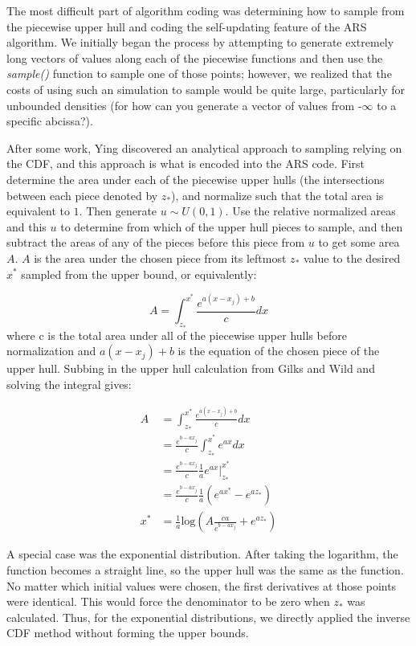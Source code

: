 \documentclass{article}
\begin{document}
The most difficult part of algorithm coding was determining how to sample from the piecewise upper hull and coding the self-updating feature of the ARS algorithm.  We initially began the process by attempting to generate extremely long vectors of values along each of the piecewise functions and then use the \textit{sample()} function to sample one of those points; however, we realized that the costs of using such an simulation to sample would be quite large, particularly for unbounded densities (for how can you generate a vector of values from -$\infty$ to a specific abcissa?).  

After some work, Ying discovered an analytical approach to sampling relying on the CDF, and this approach is what is encoded into the ARS code.  First determine the area under each of the piecewise upper hulls (the intersections between each piece denoted by $z_*$), and normalize such that the total area is equivalent to $1$.  Then generate $u\sim U\left(0, 1\right)$.  Use the relative normalized areas and this $u$ to determine from which of the upper hull pieces to sample, and then subtract the areas of any of the pieces before this piece from $u$ to get some area $A$.  $A$ is the area under the chosen piece from its leftmost $z_*$ value to the desired $x^*$ sampled from the upper bound, or equivalently:

$$A= \int_{z_*}^{x^*}\frac{e^{a\left(x-x_j\right)+b}}{c}dx$$
where c is the total area under all of the piecewise upper hulls before normalization and $a\left(x-x_j\right)+b$ is the equation of the chosen piece of the upper hull.  Subbing in the upper hull calculation from Gilks and Wild and solving the integral gives:

\begin{align*}
A &= \int_{z_*}^{x^*}\frac{e^{a\left(x-x_j\right)+b}}{c}dx\\
&= \frac{e^{b-ax_j}}{c}\int_{z_*}^{x^*}e^{ax}dx\\
&= \frac{e^{b-ax_j}}{c}\frac{1}{a}\left.e^{ax}\right|_{z_*}^{x^*}\\
&= \frac{e^{b-ax_j}}{c}\frac{1}{a}\left(e^{ax^*} - e^{az_*}\right)\\
x^* &= \frac{1}{a}\text{log}\left(A\frac{ca}{e^{b-ax_j}}+e^{az_*}\right)
\end{align*}

A special case was the exponential distribution. After taking the logarithm, the function becomes a straight line, so the upper hull was the same as the function. No matter which initial values were chosen, the first derivatives at those points were identical. This would force the denominator to be zero when $z_*$ was calculated. Thus,  for the exponential distributions, we directly applied the inverse CDF method without forming the upper bounds.
\end{document}
